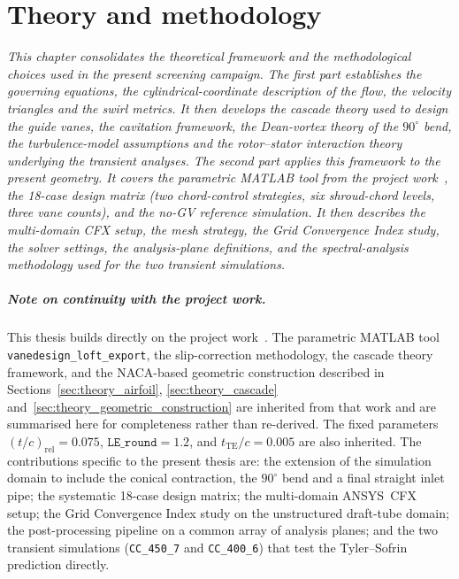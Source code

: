 \chapter{Theory and methodology}
\label{chap:theory_method}

\begin{center} %
\singlespacing\parbox{12cm}{\textit{
This chapter consolidates the theoretical framework and the methodological choices used in the present screening campaign. The first part establishes the governing equations, the cylindrical-coordinate description of the flow, the velocity triangles and the swirl metrics. It then develops the cascade theory used to design the guide vanes, the cavitation framework, the Dean-vortex theory of the $90^\circ$ bend, the turbulence-model assumptions and the rotor--stator interaction theory underlying the transient analyses. The second part applies this framework to the present geometry. It covers the parametric MATLAB tool from the project work~\cite{Leonsen2025}, the 18-case design matrix (two chord-control strategies, six shroud-chord levels, three vane counts), and the no-GV reference simulation. It then describes the multi-domain CFX setup, the mesh strategy, the Grid Convergence Index study, the solver settings, the analysis-plane definitions, and the spectral-analysis methodology used for the two transient simulations.
}}
\end{center}

\paragraph{Note on continuity with the project work.}
This thesis builds directly on the project work~\cite{Leonsen2025}. The parametric MATLAB tool \texttt{vanedesign\_loft\_export}, the slip-correction methodology, the cascade theory framework, and the NACA-based geometric construction described in Sections~\ref{sec:theory_airfoil}, \ref{sec:theory_cascade} and~\ref{sec:theory_geometric_construction} are inherited from that work and are summarised here for completeness rather than re-derived. The fixed parameters $(t/c)_{\mathrm{rel}} = 0.075$, $\texttt{LE\_round} = 1.2$, and $t_{\mathrm{TE}}/c = 0.005$ are also inherited. The contributions specific to the present thesis are: the extension of the simulation domain to include the conical contraction, the $90^\circ$ bend and a final straight inlet pipe; the systematic 18-case design matrix; the multi-domain ANSYS~CFX setup; the Grid Convergence Index study on the unstructured draft-tube domain; the post-processing pipeline on a common array of analysis planes; and the two transient simulations (\texttt{CC\_450\_7} and \texttt{CC\_400\_6}) that test the Tyler--Sofrin prediction directly.


